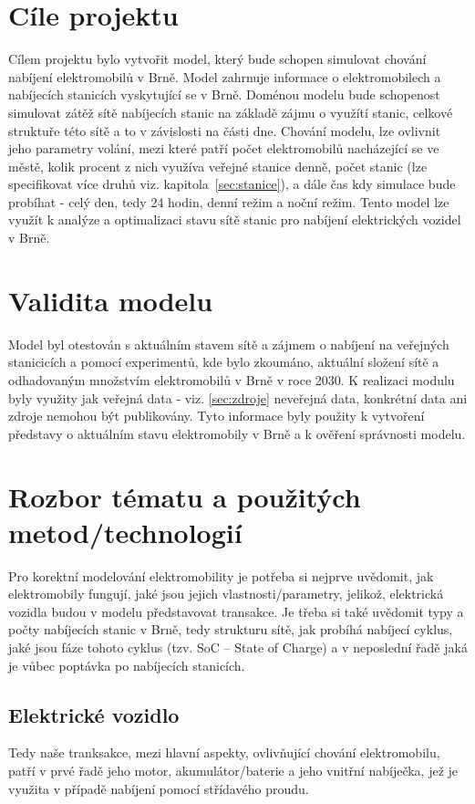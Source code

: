 \documentclass[a4paper,11pt]{article}
\begin{document}
\section{Cíle projektu}
Cílem projektu bylo vytvořit model, který bude schopen simulovat chování nabíjení elektromobilů 
v Brně. Model zahrnuje informace o elektromobilech a nabíjecích stanicích vyskytující se
v Brně. Doménou modelu bude schopenost simulovat zátěž sítě nabíjecích stanic na základě zájmu o využítí 
stanic, celkové struktuře této sítě a to v závislosti na části dne. Chování modelu, lze ovlivnit
jeho parametry volání, mezi které patří počet elektromobilů nacházející se ve městě, kolik 
procent z nich využíva veřejné stanice denně, počet stanic (lze specifikovat více druhů viz. 
kapitola~\ref{sec:stanice}), a dále čas kdy simulace bude probíhat - celý den, tedy 24 hodin, denní režim a noční
režim. Tento model lze využít k analýze a optimalizaci stavu sítě stanic pro nabíjení elektrických
vozidel v Brně.

\section{Validita modelu}
Model byl otestován s aktuálním stavem sítě a zájmem o nabíjení na veřejných stanicicích a pomocí 
experimentů, kde bylo zkoumáno, aktuální složení sítě a odhadovaným množstvím elektromobilů v Brně
v roce 2030. K realizaci modulu byly využity jak veřejná data - viz. \ref{sec:zdroje} neveřejná data, 
konkrétní data ani zdroje nemohou být publikovány. Tyto informace byly použity k vytvoření představy 
o aktuálním stavu elektromobily v Brně a k ověření správnosti modelu. 

\section{Rozbor tématu a použitých metod/technologií}
Pro korektní modelování elektromobility je potřeba si nejprve uvědomit, jak elektromobily fungují, 
jaké jsou jejich vlastnosti/parametry, jelikož, elektrická vozidla budou v modelu představovat transakce.
Je třeba si také uvědomit typy a počty nabíjecích stanic v Brně, tedy strukturu sítě, jak probíhá
nabíjecí cyklus, jaké jsou fáze tohoto cyklus (tzv. SoC -- State of Charge) a v neposlední řadě 
jaká je vůbec poptávka po nabíjecích stanicích.  

\subsection{Elektrické vozidlo}
Tedy naše tranksakce, mezi hlavní aspekty, ovlivňující chování elektromobilu, patří v prvé řadě 
jeho motor, akumulátor/baterie a jeho vnitřní nabíječka, jež je využita v případě nabíjení pomocí
střídavého proudu.
\end{document}
